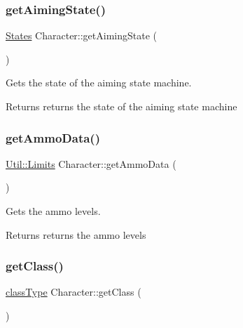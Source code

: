 \subsubsection{\texorpdfstring{get\+Aiming\+State()}{getAimingState()}}
{\footnotesize\ttfamily \hyperlink{_character_8h_a808e5cd4979462d3bbe3070d7d147444}{States} Character\+::get\+Aiming\+State (\begin{DoxyParamCaption}{ }\end{DoxyParamCaption})}



Gets the state of the aiming state machine. 

\begin{DoxyReturn}{Returns}
returns the state of the aiming state machine 
\end{DoxyReturn}
\mbox{\label{class_character_a72edf0df90187cc5f8628e46c4124eef}} 
\subsubsection{\texorpdfstring{get\+Ammo\+Data()}{getAmmoData()}}
{\footnotesize\ttfamily \hyperlink{struct_util_1_1_limits}{Util\+::\+Limits} Character\+::get\+Ammo\+Data (\begin{DoxyParamCaption}{ }\end{DoxyParamCaption})}



Gets the ammo levels. 

\begin{DoxyReturn}{Returns}
returns the ammo levels 
\end{DoxyReturn}
\mbox{\label{class_character_ac007885afee1d0d6e91a4aabe57cda27}} 
\subsubsection{\texorpdfstring{get\+Class()}{getClass()}}
{\footnotesize\ttfamily \hyperlink{_weapon_8h_ab84a9103ee8e782337e098ae19af7a29}{class\+Type} Character\+::get\+Class (\begin{DoxyParamCaption}{ }\end{DoxyParamCaption})}




